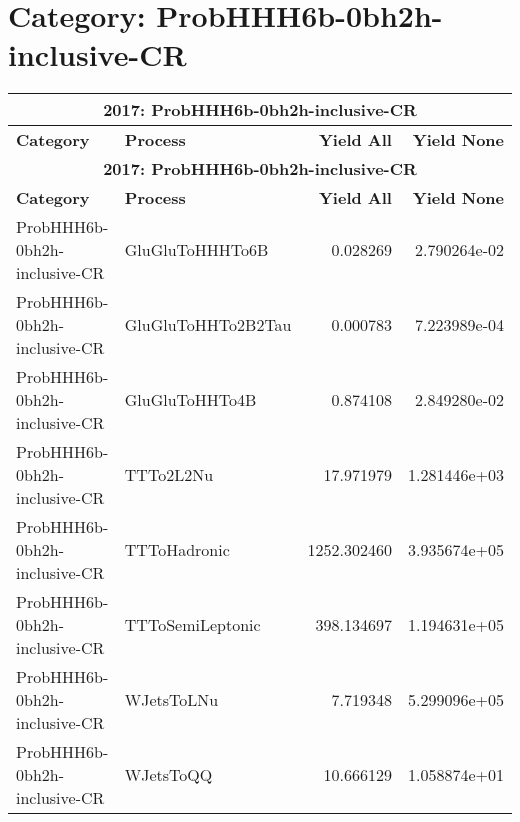 \documentclass{article}
\begin{document}
\section*{Category: ProbHHH6b-0bh2h-inclusive-CR}
\begin{longtable}[c]{|l|l|r|r|}
\hline
\multicolumn{4}{|c|}{\textbf{2017: ProbHHH6b-0bh2h-inclusive-CR}} \\
\hline
\textbf{Category} & \textbf{Process} & \textbf{Yield All} & \textbf{Yield None} \\
\hline
\endfirsthead
\hline
\multicolumn{4}{|c|}{\textbf{2017: ProbHHH6b-0bh2h-inclusive-CR}} \\
\hline
\textbf{Category} & \textbf{Process} & \textbf{Yield All} & \textbf{Yield None} \\
\hline
\endhead
ProbHHH6b-0bh2h-inclusive-CR & GluGluToHHHTo6B & 0.028269 & 2.790264e-02 \\
\hline
ProbHHH6b-0bh2h-inclusive-CR & GluGluToHHTo2B2Tau & 0.000783 & 7.223989e-04 \\
\hline
ProbHHH6b-0bh2h-inclusive-CR & GluGluToHHTo4B & 0.874108 & 2.849280e-02 \\
\hline
ProbHHH6b-0bh2h-inclusive-CR & TTTo2L2Nu & 17.971979 & 1.281446e+03 \\
\hline
ProbHHH6b-0bh2h-inclusive-CR & TTToHadronic & 1252.302460 & 3.935674e+05 \\
\hline
ProbHHH6b-0bh2h-inclusive-CR & TTToSemiLeptonic & 398.134697 & 1.194631e+05 \\
\hline
ProbHHH6b-0bh2h-inclusive-CR & WJetsToLNu & 7.719348 & 5.299096e+05 \\
\hline
ProbHHH6b-0bh2h-inclusive-CR & WJetsToQQ & 10.666129 & 1.058874e+01 \\
\hline
\end{longtable}
\end{document}

